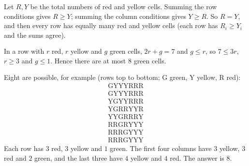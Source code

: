 Let $R,Y$ be the total numbers of red and yellow cells. Summing the row conditions gives $R\ge Y$; summing the column conditions gives $Y\ge R$. So $R=Y$, and then every row has equally many red and yellow cells (each row has $R_i\ge Y_i$ and the sums agree).

In a row with $r$ red, $r$ yellow and $g$ green cells, $2r+g=7$ and $g\le r$, so $7\le3r$, $r\ge3$ and $g\le1$. Hence there are at most $8$ green cells.

Eight are possible, for example (rows top to bottom; G green, Y yellow, R red):
\[\begin{array}{c}\text{GYYYRRR}\\\text{GYYYRRR}\\\text{YGYYRRR}\\\text{YGRRYYR}\\\text{YYGRRRY}\\\text{RRGRYYY}\\\text{RRRGYYY}\\\text{RRRGYYY}\end{array}\]
Each row has $3$ red, $3$ yellow and $1$ green. The first four columns have $3$ yellow, $3$ red and $2$ green, and the last three have $4$ yellow and $4$ red. The answer is $\boxed{8}$.
